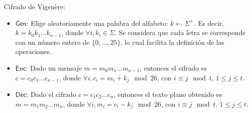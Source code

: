 \documentclass[]{book}
\theoremstyle{definition}
\begin{document}
\begin{enumerate}
Cifrado de Vigenère:
\begin{itemize}
\item $\mathsf{Gen}$: Elige aleatoriamente una palabra del alfabeto: $k
  \leftarrow \Sigma^+$. Es decir, $k = k_0k_1\dots k_{n-1}$, donde $\forall
  i, k_i \in \Sigma$. Se considera que cada letra se corresponde con un número
  entero de $\{0,\dots,25\}$, lo cual facilita la definición de las operaciones.
  \item $\mathsf{Enc}$: Dado un mensaje $m = m_0m_1\dots m_{n-1}$, entonces el
  cifrado es $c = c_0c_1\dots c_{n-1}$, donde $\forall i, c_i = m_i +
  k_j \mod 26$, con $i \equiv j \mod t$, $1 \leq j \leq t$.
  \item $\mathsf{Dec}$: Dado el cifrado $c = c_1c_2\dots c_n$, entonces el texto
  plano obtenido es $m = m_1m_2\dots m_n$, donde $\forall i, m_i = c_i - k_j \mod 26$, con $i \equiv j \mod t$, $1 \leq j \leq t$.
\end{itemize}
\end{enumerate}
\end{document}
